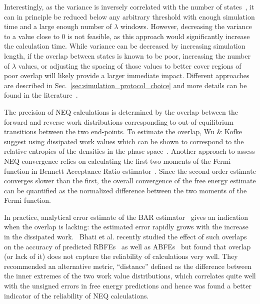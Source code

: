 Interestingly, as the variance is inversely correlated with the number of states~\cite{klimovich2015guidelines}, it can in principle be reduced below any arbitrary threshold with enough simulation time and a large enough number of $\lambda$ windows. However, decreasing the variance to a value close to 0 is not feasible, as this approach would significantly increase the calculation time. While variance can be decreased by increasing simulation length, if the overlap between states is known to be poor, increasing the number of $\lambda$ values, or adjusting the spacing of those values to better cover regions of poor overlap will likely provide a larger immediate impact. Different approaches are described in Sec.~\ref{sec:simulation_protocol_choice} and more details can be found in the literature~\cite{dakka2018concurrent, hahn2019alchemical}.

The precision of NEQ calculations is determined by the overlap between the forward and reverse work distributions corresponding to out-of-equilibrium transitions between the two end-points. To estimate the overlap, Wu \& Kofke suggest using dissipated work values which can be shown to correspond to the relative entropies of the densities in the phase space~\cite{wu2005phase}. Another approach to assess NEQ convergence relies on calculating the first two moments of the Fermi function in Bennett Acceptance Ratio estimator~\cite{hahn2010measuring}. Since the second order estimate converges slower than the first, the overall convergence of the free energy estimate can be quantified as the normalized difference between the two moments of the Fermi function. 

In practice, analytical error estimate of the BAR estimator~\cite{shirts2003equilibrium} gives an indication when the overlap is lacking: the estimated error rapidly grows with the increase in the dissipated work.~\cite{shirts2005comparison} Bhati et al. recently studied the effect of such overlaps on the accuracy of predicted RBFEs~\cite{wan2023eqvsneq} as well as ABFEs~\cite{bhati2025} but found that overlap (or lack of it) does not capture the reliability of calculations very well. They recommended an alternative metric, ``distance'' defined as the difference between the inner extremes of the two work value distributions, which correlates quite well with the unsigned errors in free energy predictions and hence was found a better indicator of the reliability of NEQ calculations. 

